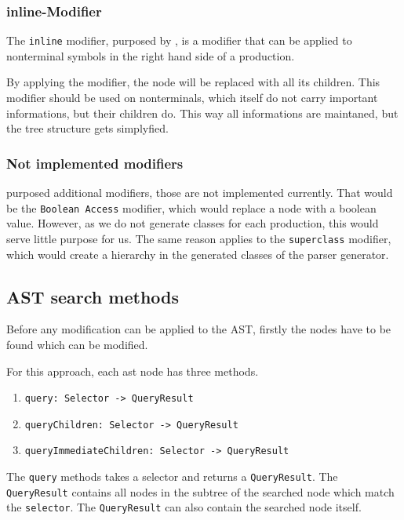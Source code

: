 \subsubsection{inline-Modifier}

The \verb|inline| modifier, purposed by \cite{GeneratingRewritableAST}, is a modifier that can be applied to nonterminal symbols in the right hand side of a production. 

By applying the modifier, the node will be replaced with all its children. This modifier should be used on nonterminals, which itself do not carry important informations, but their children do. This way all informations are maintaned, but the tree structure gets simplyfied.

\subsubsection{Not implemented modifiers}

\cite{GeneratingRewritableAST} purposed additional modifiers, those are not implemented currently. That would be the \verb|Boolean Access| modifier, which would replace a node with a boolean value. However, as we do not generate classes for each production, this would serve little purpose for us. The same reason applies to the \verb|superclass| modifier, which would create a hierarchy in the generated classes of the parser generator.

\subsection{AST search methods}

Before any modification can be applied to the AST, firstly the nodes have to be found which can be modified.

For this approach, each ast node has three methods.

\begin{enumerate}
\item \verb|query: Selector -> QueryResult|
\item \verb|queryChildren: Selector -> QueryResult|
\item \verb|queryImmediateChildren: Selector -> QueryResult|
\end{enumerate}

The \verb|query| methods takes a selector and returns a \verb|QueryResult|. The \verb|QueryResult| contains all nodes in the subtree of the searched node which match the \verb|selector|. The \verb|QueryResult| can also contain the searched node itself.

